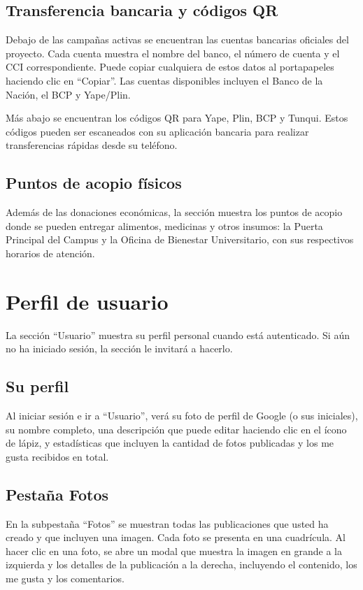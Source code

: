 \documentclass[12pt,a4paper]{article}
\begin{document}
\subsection{Transferencia bancaria y códigos QR}

Debajo de las campañas activas se encuentran las cuentas bancarias oficiales del proyecto. Cada cuenta muestra el nombre del banco, el número de cuenta y el CCI correspondiente. Puede copiar cualquiera de estos datos al portapapeles haciendo clic en ``Copiar''. Las cuentas disponibles incluyen el Banco de la Nación, el BCP y Yape/Plin.

Más abajo se encuentran los códigos QR para Yape, Plin, BCP y Tunqui. Estos códigos pueden ser escaneados con su aplicación bancaria para realizar transferencias rápidas desde su teléfono.

\subsection{Puntos de acopio físicos}

Además de las donaciones económicas, la sección muestra los puntos de acopio donde se pueden entregar alimentos, medicinas y otros insumos: la Puerta Principal del Campus y la Oficina de Bienestar Universitario, con sus respectivos horarios de atención.

\section{Perfil de usuario}

La sección ``Usuario'' muestra su perfil personal cuando está autenticado. Si aún no ha iniciado sesión, la sección le invitará a hacerlo.

\subsection{Su perfil}

Al iniciar sesión e ir a ``Usuario'', verá su foto de perfil de Google (o sus iniciales), su nombre completo, una descripción que puede editar haciendo clic en el ícono de lápiz, y estadísticas que incluyen la cantidad de fotos publicadas y los me gusta recibidos en total.

\subsection{Pestaña Fotos}

En la subpestaña ``Fotos'' se muestran todas las publicaciones que usted ha creado y que incluyen una imagen. Cada foto se presenta en una cuadrícula. Al hacer clic en una foto, se abre un modal que muestra la imagen en grande a la izquierda y los detalles de la publicación a la derecha, incluyendo el contenido, los me gusta y los comentarios.
\end{document}
